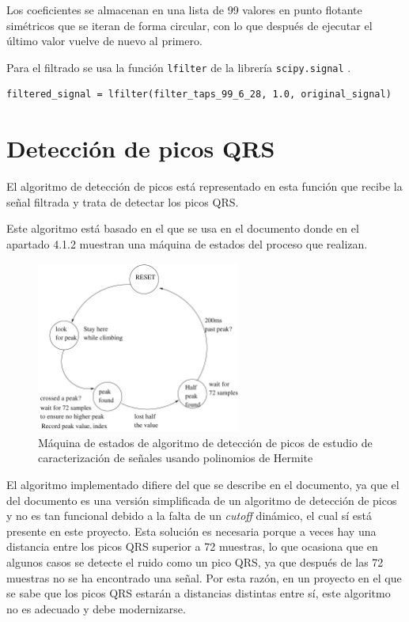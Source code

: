Los coeficientes se almacenan en una lista de 99 valores en punto flotante simétricos que se iteran de forma circular, con lo que después de ejecutar el último valor vuelve de nuevo al primero.  

Para el filtrado se usa la función \texttt{lfilter} de la librería \texttt{scipy.signal} \cite{SciPy}.

\lstset{language=python, breaklines=true, basicstyle=\footnotesize}
\begin{lstlisting}[frame=single]
    filtered_signal = lfilter(filter_taps_99_6_28, 1.0, original_signal)
\end{lstlisting}

\section{Detección de picos QRS}

El algoritmo de detección de picos está representado en esta función que recibe la señal filtrada y trata de detectar los picos QRS.

Este algoritmo está basado en el que se usa en el documento \cite{desai2021low} donde en el apartado 4.1.2 muestran una máquina de estados del proceso que realizan.

\begin{figure}[h!]
    \centering
    \includegraphics[width=0.6\textwidth]{./Images/img_algoritmo/fsm_mdpi.png}
    \caption{Máquina de estados de algoritmo de detección de picos de estudio de caracterización de señales usando polinomios de Hermite \cite{desai2021low}}
    \label{fig:fsm_mpdi}
\end{figure}

El algoritmo implementado difiere del que se describe en el documento, ya que el del documento es una versión simplificada de un algoritmo de detección de picos y no es tan funcional debido a la falta de un \textit{cutoff} dinámico, el cual sí está presente en este proyecto. Esta solución es necesaria porque a veces hay una distancia entre los picos QRS superior a 72 muestras, lo que ocasiona que en algunos casos se detecte el ruido como un pico QRS, ya que después de las 72 muestras no se ha encontrado una señal. Por esta razón, en un proyecto en el que se sabe que los picos QRS estarán a distancias distintas entre sí, este algoritmo no es adecuado y debe modernizarse.


